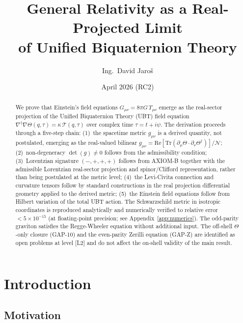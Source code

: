 \documentclass[12pt,a4paper]{article}
\title{\textbf{General Relativity as a Real-Projected Limit\\
       of Unified Biquaternion Theory}}
\author{Ing.\ David Jaroš}
\date{April 2026 (RC2)}
\theoremstyle{definition}
\theoremstyle{remark}
\newcommand{\Tr}{\mathrm{Tr}}
\newcommand{\re}{\mathrm{Re}}
\newcommand{\calN}{\mathcal{N}}
\begin{document}
\maketitle

\begin{abstract}
We prove that Einstein's field equations $G_{\mu\nu} = 8\pi G\,T_{\mu\nu}$
emerge as the real-sector projection of the Unified Biquaternion Theory (UBT)
field equation
$\nabla^\dagger\nabla\Theta(q,\tau) = \kappa\,\mathcal{T}(q,\tau)$
over complex time $\tau = t + i\psi$.
The derivation proceeds through a five-step chain:
(1)~the spacetime metric $g_{\mu\nu}$ is a derived quantity, not postulated,
emerging as the real-valued bilinear
$g_{\mu\nu} = \re[\Tr(\partial_\mu\Theta \cdot \partial_\nu\Theta^\dagger)]/\calN$;
(2)~non-degeneracy $\det(g) \neq 0$ follows from the admissibility condition;
(3)~Lorentzian signature $(-,+,+,+)$ follows from AXIOM-B together with the
admissible Lorentzian real-sector projection and spinor/Clifford representation,
rather than being postulated at the metric level;
(4)~the Levi-Civita connection and curvature tensors follow by standard constructions in the real projection
differential geometry applied to the derived metric;
(5)~the Einstein field equations follow from Hilbert variation of the total
UBT action.
The Schwarzschild metric in isotropic coordinates is reproduced analytically
and numerically verified to relative error $< 5\times 10^{-15}$
(at floating-point precision; see Appendix~\ref{app:numerics}).
The odd-parity graviton satisfies the Regge-Wheeler equation without
additional input.
The off-shell $\Theta$-only closure (GAP-10) and the even-parity Zerilli
equation (GAP-Z) are identified as open problems at level [L2] and do not
affect the on-shell validity of the main result.
\end{abstract}

\tableofcontents
\bigskip\bigskip

\section{Introduction}
\label{sec:intro}

\subsection{Motivation}
\end{document}

